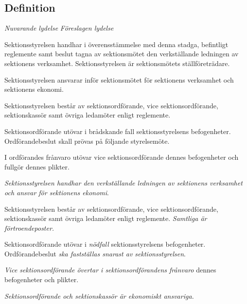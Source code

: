 \documentclass{article}
\newenvironment{lydelse}
    {\begin{paracol}{2}%
        \emph{Nuvarande lydelse}%
        \switchcolumn%
        \emph{Föreslagen lydelse}%
    \end{paracol}%
    \begin{enumerate}[label=\thesubsection.\arabic*]%
    \begin{paracol}{2}%
    }{\end{paracol}\end{enumerate}}
\begin{document}
\subsection{Definition}
\begin{lydelse}
  \setcounter{section}{7}
  \setcounter{subsection}{1}
  \item Sektionsstyrelsen handhar i överensstämmelse med denna stadga, befintligt reglemente samt beslut tagna av sektionsmötet den verkställande ledningen av sektionens verksamhet. Sektionsstyrelsen är sektionsmötets ställföreträdare.

  \setcounter{subsection}{3}
  \setcounter{enumi}{0}
  \item Sektionsstyrelsen ansvarar inför sektionsmötet för sektionens verksamhet och sektionens ekonomi.

  \setcounter{section}{7}
  \setcounter{subsection}{2}
  \item Sektionsstyrelsen består av sektionsordförande, vice sektionsordförande, sektionskassör samt övriga ledamöter enligt reglemente.

  \setcounter{subsection}{9}
  \item Sektionsordförande utövar i brådskande fall sektionsstyrelsens befogenheter. Ordförandebeslut skall prövas på följande styrelsemöte.

  \item I ordförandes frånvaro utövar vice sektionsordförande dennes befogenheter och fullgör dennes plikter.
\switchcolumn
  \item \emph{Sektionsstyrelsen handhar den verkställande ledningen av sektionens verksamhet och ansvar för sektionens ekonomi}.

  \item Sektionsstyrelsen består av sektionsordförande, vice sektionsordförande, sektionskassör samt övriga ledamöter enligt reglemente.
    \emph{Samtliga är förtroendeposter.}

  \item Sektionsordförande utövar i \emph{nödfall} sektionsstyrelsens befogenheter.
    Ordförandebeslut \emph{ska fastställas snarast av sektionsstyrelsen}.

  \item \emph{Vice sektionsordförande övertar i sektionsordförandens frånvaro} dennes befogenheter och plikter.
  \label{S:ViceLaRevolution}

  \item \emph{Sektionsordförande och sektionskassör är ekonomiskt ansvariga.}
  \label{S:SektionsstyrelseEkonomisktAnsvariga}
\end{lydelse}
\setcounter{section}{6}
\setcounter{subsection}{1}
\end{document}
